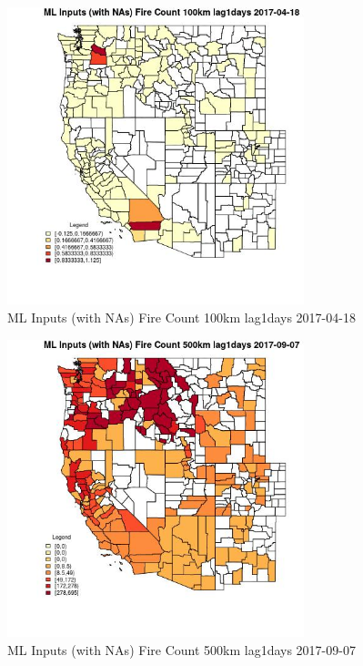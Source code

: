 \begin{figure} 
\centering  
\includegraphics[width=0.77\textwidth]{Code_Outputs/Report_ML_input_PM25_Step4_part_e_de_duplicated_aves_compiled_2019-05-20wNAs_CountyFire_Count_100km_lag1daysMean2017-04-18.jpg} 
\caption{\label{fig:Report_ML_input_PM25_Step4_part_e_de_duplicated_aves_compiled_2019-05-20wNAsCountyFire_Count_100km_lag1daysMean2017-04-18}ML Inputs (with NAs) Fire Count 100km lag1days 2017-04-18} 
\end{figure} 
 

\begin{figure} 
\centering  
\includegraphics[width=0.77\textwidth]{Code_Outputs/Report_ML_input_PM25_Step4_part_e_de_duplicated_aves_compiled_2019-05-20wNAs_CountyFire_Count_500km_lag1daysMean2017-09-07.jpg} 
\caption{\label{fig:Report_ML_input_PM25_Step4_part_e_de_duplicated_aves_compiled_2019-05-20wNAsCountyFire_Count_500km_lag1daysMean2017-09-07}ML Inputs (with NAs) Fire Count 500km lag1days 2017-09-07} 
\end{figure} 
 

